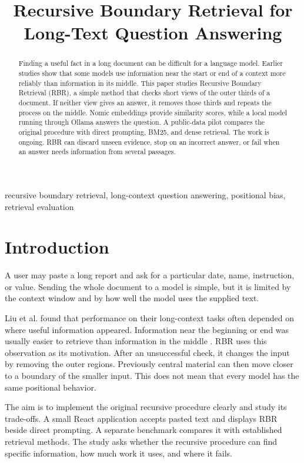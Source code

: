 \documentclass[conference]{IEEEtran}
\begin{document}
\title{Recursive Boundary Retrieval for Long-Text Question Answering}
\author{}
\maketitle
\begin{abstract}
Finding a useful fact in a long document can be difficult for a language model. Earlier studies show that some models use information near the start or end of a context more reliably than information in its middle. This paper studies Recursive Boundary Retrieval (RBR), a simple method that checks short views of the outer thirds of a document. If neither view gives an answer, it removes those thirds and repeats the process on the middle. Nomic embeddings provide similarity scores, while a local model running through Ollama answers the question. A public-data pilot compares the original procedure with direct prompting, BM25, and dense retrieval. The work is ongoing. RBR can discard unseen evidence, stop on an incorrect answer, or fail when an answer needs information from several passages.
\end{abstract}
\begin{IEEEkeywords}
recursive boundary retrieval, long-context question answering, positional bias, retrieval evaluation
\end{IEEEkeywords}

\section{Introduction}
A user may paste a long report and ask for a particular date, name, instruction, or value. Sending the whole document to a model is simple, but it is limited by the context window and by how well the model uses the supplied text.

Liu et al. found that performance on their long-context tasks often depended on where useful information appeared. Information near the beginning or end was usually easier to retrieve than information in the middle \cite{liu}. RBR uses this observation as its motivation. After an unsuccessful check, it changes the input by removing the outer regions. Previously central material can then move closer to a boundary of the smaller input. This does not mean that every model has the same positional behavior.

The aim is to implement the original recursive procedure clearly and study its trade-offs. A small React application accepts pasted text and displays RBR beside direct prompting. A separate benchmark compares it with established retrieval methods. The study asks whether the recursive procedure can find specific information, how much work it uses, and where it fails.
\end{document}
